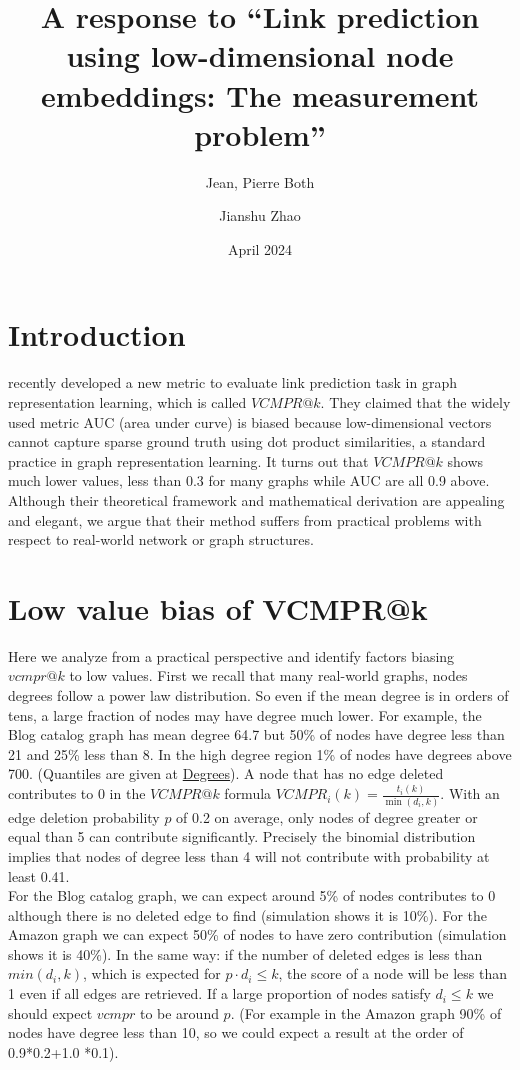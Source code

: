 \documentclass{article}
\title{A response to “Link prediction using low-dimensional node embeddings:
The measurement problem”}
\author[1,*]{Jean, Pierre Both}
\author[2]{Jianshu Zhao}
\affil[1]{Université Paris-Saclay, CEA, List, Palaiseau, France. (Retired)}
\affil[2]{Center for Bioinformatics and Computational Genomics, Georgia Institute of Technology, Atlanta, Georgia, USA}
\affil[*]{Corresponding author : jeanpierre.both@gmail.com}
\date{April 2024}
\begin{document}
\maketitle

\section{Introduction}

\citet{Menand} recently developed a new metric to evaluate link prediction task in graph representation learning, which is called $VCMPR@k$.
They claimed that the widely used metric AUC (area under curve) is biased because low-dimensional vectors cannot capture sparse ground truth using dot product similarities, a standard practice in graph representation learning.
It turns out that $VCMPR@k$ shows much lower values, less than 0.3 for many graphs while AUC are all 0.9 above. Although their theoretical framework and mathematical derivation are appealing and elegant, we argue that their method suffers from practical problems with respect to real-world network or graph structures.


\section{Low value bias of VCMPR@k}

Here we analyze from a practical perspective and identify factors biasing $vcmpr@k$ to low values.
First we recall that many real-world graphs, nodes degrees follow a power law distribution.
So even if the mean degree is in orders of tens, a large fraction of nodes may have degree much lower.
For example, the Blog catalog graph has mean degree 64.7 but 50\% of nodes have degree less than 21 and 25\% less than 8. In the high degree region 1\% of nodes have degrees above 700. (Quantiles are given at  \href{https://github.com/jean-pierreBoth/linkauc/tree/master/Degrees}{\color{blue}Degrees}).
A node that has no edge deleted contributes to 0 in the $VCMPR@k$ formula $ VCMPR_{i}(k)= \frac{t_{i}(k)}{\min(d_{i},k)}$. With an edge deletion probability $p$ of 0.2 on average, only nodes of degree greater or equal than 5 can contribute significantly. Precisely the binomial distribution implies that nodes of degree less than 4 will not contribute with probability at least 0.41. \\
For the Blog catalog graph, we can expect around 5\% of nodes contributes to 0 although there is no deleted edge to find (simulation shows it is 10\%).
For the Amazon graph we can expect 50\% of nodes to have zero contribution (simulation shows it is 40\%).
In the same way: if the number of deleted edges is less than $min(d_{i},k)$, which is expected for $p \cdot d_{i} \leq k$, the score of a node will be less than 1 even if all edges are retrieved.
If a large proportion of nodes satisfy $d_{i} \le k$ we should expect $vcmpr$ to be around $p$. (For example in the Amazon graph 90\% of nodes have degree less than 10, so we could expect a result at the order of 0.9*0.2+1.0 *0.1).\\
\end{document}
